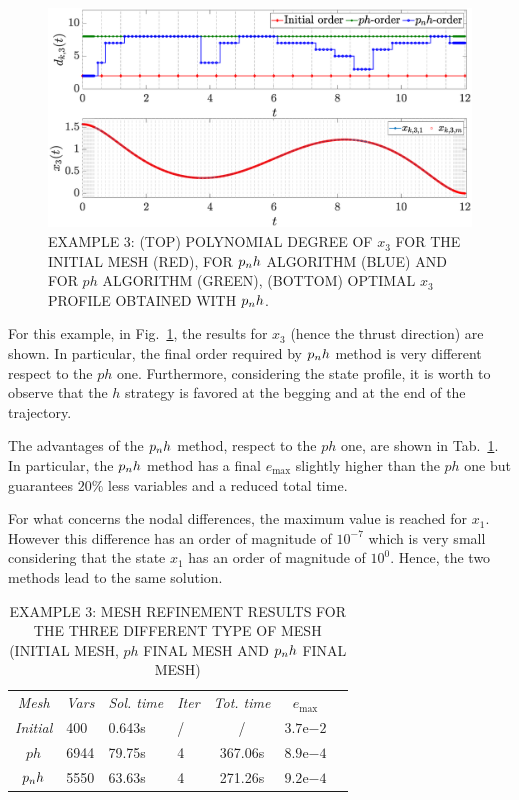 \begin{figure}[t]
	\centering
	\includegraphics[trim={1cm 0.1cm 2cm 1.05cm},clip,width=1.\linewidth]{Img/pnh1_free}
	\caption{EXAMPLE 3: (TOP) POLYNOMIAL DEGREE OF $x_{3}$ FOR THE INITIAL MESH (RED), FOR $p_{n}h$ ALGORITHM (BLUE) AND FOR $ph$ ALGORITHM (GREEN), (BOTTOM) OPTIMAL $x_3$ PROFILE OBTAINED WITH $p_{n}h$. }
	\label{fig:pnh1free}
\end{figure}
For this example,  in Fig.~\ref{fig:pnh1free}, the results for $x_3$ (hence the thrust direction) are shown. In particular, the final order required by $p_{n}h$ method is very different respect to the $ph$ one. Furthermore, considering the state profile, it is worth to observe that the $h$ strategy is favored at the begging and at the end of the trajectory.

The advantages of the $p_{n}h$ method, respect to the $ph$ one, are shown in Tab.~\ref{tab:tablefree}. In particular, the $p_{n}h$ method has a final $e_\text{max}$ slightly higher than the $ph$ one but guarantees $20\%$ less variables and a reduced total time.

For what concerns the nodal differences, the maximum value is reached for $x_1$. However this difference has an order of magnitude of $10^{-7}$ which is very small considering that the state $x_1$ has an order of magnitude of $10^0$. Hence, the two methods lead to the same solution.
\begin{table}[t]
	\caption{EXAMPLE 3: MESH REFINEMENT RESULTS FOR THE THREE DIFFERENT TYPE OF MESH (INITIAL MESH, $ph$ FINAL MESH AND $p_{n}h$ FINAL MESH)}
	\begin{center}
		\label{tab:tablefree}
		\begin{tabular}{c l l l c c c}
			& & \\ %
			\hline
			\emph{Mesh} & \emph{Vars} & \emph{Sol. time} & \emph{Iter} & \emph{Tot. time} & $e_\text{max}$ \\
			\hline
			\emph{Initial} & 400 & 0.643s & / & / &  $3.7\mathrm{e}{-2}$\\
			$ph$  & 6944 & 79.75s & 4 & 367.06s & $8.9\mathrm{e}{-4}$ \\
			$p_{n}h$ & 5550 & 63.63s & 4 & 271.26s & $9.2\mathrm{e}{-4}$ \\
			\hline
		\end{tabular}
	\end{center}
\end{table}


